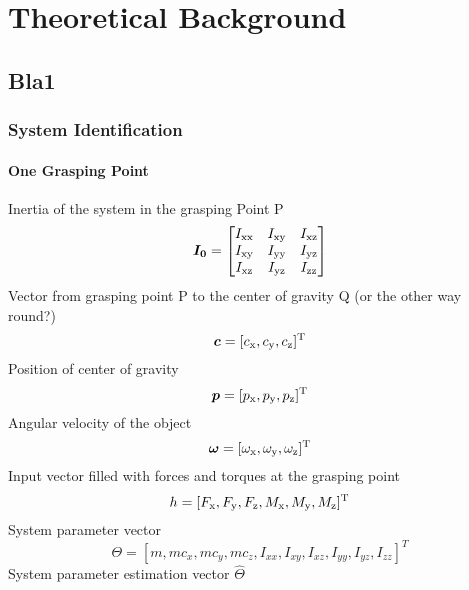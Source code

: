 

\chapter{Theoretical Background}

\section{Bla1}
\label{sec:bla1}
\lipsum[1] 

\subsection{System Identification}
\label{subsec:system_identification}

\subsubsection{One Grasping Point}
Inertia of the system in the grasping Point P
\begin{equation}
	\boldsymbol{I_0} = 
	\begin{bmatrix}	
		I_{\mathrm{xx}}	& I_{\mathrm{xy}}	& I_{\mathrm{xz}} \\
		I_{\mathrm{xy}}	& I_{\mathrm{yy}}	& I_{\mathrm{yz}} \\
		I_{\mathrm{xz}}	& I_{\mathrm{yz}}	& I_{\mathrm{zz}}
	\end{bmatrix}
\end{equation}
Vector from grasping point P to the center of gravity Q (or the other way round?)
\begin{equation}
	\boldsymbol{c} = [c_{\mathrm{x}}, c_{\mathrm{y}}, c_{\mathrm{z}}]^{\mathrm{T}}
\end{equation}
Position of center of gravity
\begin{equation}
	\boldsymbol{p} = [p_{\mathrm{x}}, p_{\mathrm{y}}, p_{\mathrm{z}}]^{\mathrm{T}}
\end{equation}
Angular velocity of the object
\begin{equation}
	\boldsymbol{\omega} = [\omega_{\mathrm{x}}, \omega_{\mathrm{y}}, \omega_{\mathrm{z}}]^{\mathrm{T}}
\end{equation}
Input vector filled with forces and torques at the grasping point
\begin{equation}
	h = [F_{\mathrm{x}}, F_{\mathrm{y}}, F_{\mathrm{z}}, M_{\mathrm{x}}, M_{\mathrm{y}}, M_{\mathrm{z}}]^{\mathrm{T}}
\end{equation}
System parameter vector
\begin{equation}
	\Theta = [m, m c_x, m c_y, m c_z, I_{xx}, I_{xy}, I_{xz}, I_{yy}, I_{yz}, I_{zz}]^T
\end{equation}
System parameter estimation vector $\hat \Theta$

